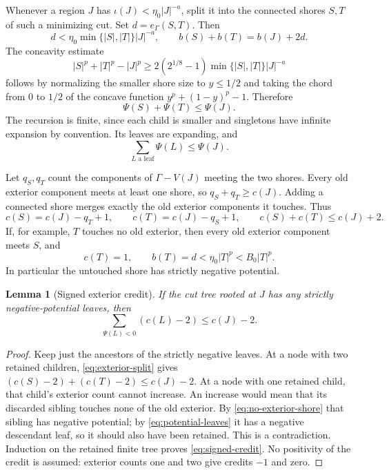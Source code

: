 \documentclass[11pt,a4paper]{article}
\numberwithin{equation}{section}
\newtheorem{lemma}[theorem]{Lemma}
\theoremstyle{definition}
\theoremstyle{remark}
\begin{document}
Whenever a region $J$ has $\iota(J)<\eta_0|J|^{-a}$, split it into the connected shores $S,T$ of such a minimizing cut. Set $d=e_\Gamma(S,T)$. Then
\[
 d<\eta_0\min\{|S|,|T|\}|J|^{-a},\qquad b(S)+b(T)=b(J)+2d.
\]
The concavity estimate
\[
 |S|^p+|T|^p-|J|^p
 \ge2(2^{1/8}-1)\min\{|S|,|T|\}|J|^{-a}
\]
follows by normalizing the smaller shore size to $y\le1/2$ and taking the chord from $0$ to $1/2$ of the concave function $y^p+(1-y)^p-1$. Therefore
\begin{equation}\label{eq:potential-split}
 \Psi(S)+\Psi(T)\le\Psi(J).
\end{equation}
The recursion is finite, since each child is smaller and singletons have infinite expansion by convention. Its leaves are expanding, and
\begin{equation}\label{eq:potential-leaves}
 \sum_{L\text{ a leaf}}\Psi(L)\le\Psi(J).
\end{equation}

Let $q_S,q_T$ count the components of $\Gamma-V(J)$ meeting the two shores. Every old exterior component meets at least one shore, so $q_S+q_T\ge c(J)$. Adding a connected shore merges exactly the old exterior components it touches. Thus
\begin{equation}\label{eq:exterior-split}
 c(S)=c(J)-q_T+1,\qquad c(T)=c(J)-q_S+1,
 \qquad c(S)+c(T)\le c(J)+2.
\end{equation}
If, for example, $T$ touches no old exterior, then every old exterior component meets $S$, and
\begin{equation}\label{eq:no-exterior-shore}
 c(T)=1,\qquad b(T)=d<\eta_0|T|^p<B_0|T|^p.
\end{equation}
In particular the untouched shore has strictly negative potential.

\begin{lemma}[Signed exterior credit]\label{lem:credit}
If the cut tree rooted at $J$ has any strictly negative-potential leaves, then
\begin{equation}\label{eq:signed-credit}
 \sum_{\Psi(L)<0}(c(L)-2)\le c(J)-2.
\end{equation}
\end{lemma}
\begin{proof}
Keep just the ancestors of the strictly negative leaves. At a node with two retained children, \eqref{eq:exterior-split} gives
$(c(S)-2)+(c(T)-2)\le c(J)-2$.
At a node with one retained child, that child's exterior count cannot increase. An increase would mean that its discarded sibling touches none of the old exterior. By \eqref{eq:no-exterior-shore} that sibling has negative potential; by \eqref{eq:potential-leaves} it has a negative descendant leaf, so it should also have been retained. This is a contradiction. Induction on the retained finite tree proves \eqref{eq:signed-credit}. No positivity of the credit is assumed: exterior counts one and two give credits $-1$ and zero.
\end{proof}
\end{document}
